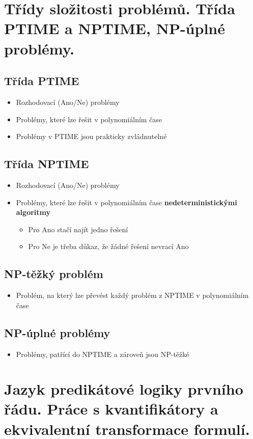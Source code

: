 \documentclass[openany]{book}
\begin{document}
\section{Třídy složitosti problémů. Třída PTIME a NPTIME, NP-úplné problémy.}
\subsection{Třída PTIME}
\begin{itemize}
    \item Rozhodovací (Ano/Ne) problémy
    \item Problémy, které lze řešit v polynomiálním čase
    \item Problémy v PTIME jsou prakticky zvládnutelné
\end{itemize}
\subsection{Třída NPTIME}
\begin{itemize}
    \item Rozhodovací (Ano/Ne) problémy
    \item Problémy, které lze řešit v polynomiálním čase \textbf{nedeterministickými algoritmy}
    \begin{itemize}
        \item Pro Ano stačí najít jedno řešení
        \item Pro Ne je třeba důkaz, že žádné řešení nevrací Ano
    \end{itemize}
\end{itemize}
\subsection{NP-těžký problém}
\begin{itemize}
    \item Problém, na který lze převést každý problém z NPTIME v polynomiálním čase 
\end{itemize}
\subsection{NP-úplné problémy}
\begin{itemize}
    \item Problémy, patřící do NPTIME a zároveň jsou NP-těžké
\end{itemize}


\section{Jazyk predikátové logiky prvního řádu. Práce s kvantifikátory a ekvivalentní transformace formulí.}
\end{document}
